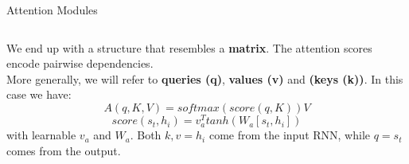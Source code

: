 \documentclass[9pt]{beamer}
\begin{document}
\iffalse
\begin{frame}{Attention Modules}
\begin{columns}[onlytextwidth]
    \begin{column}{0.50\textwidth}
    We end up with a structure that resembles a \textbf{matrix}. The attention scores encode pairwise dependencies.\\
     {More generally, we will refer to \textbf{queries (q)}, \textbf{values (v)} and \textbf{(keys (k))}. In this case we have:
    $$ A(q,K,V) = softmax(score(q,K))V$$
    $$score(s_t,h_i) = v_a^Ttanh(W_a[s_t,h_i])$$
    with learnable $v_a$ and $W_a$. Both $k,v=h_i$ come from the input RNN, while $q=s_t$ comes from the output. }
    \end{column}
\end{columns}
\end{frame}
\end{document}
